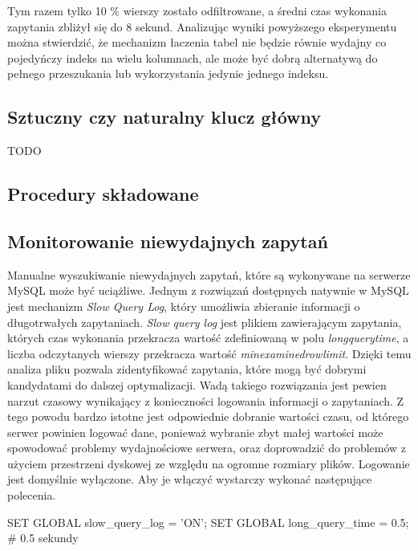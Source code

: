 Tym razem tylko 10 \% wierszy zostało odfiltrowane, a średni czas wykonania zapytania zbliżył się do 8 sekund. Analizując wyniki powyższego eksperymentu można stwierdzić, że mechanizm łaczenia tabel nie będzie równie wydajny co pojedyńczy indeks na wielu kolumnach, ale może być dobrą alternatywą do pełnego przeszukania lub wykorzystania jedynie jednego indeksu.
\subsection{Sztuczny czy naturalny klucz główny}
TODO

\subsection{Procedury składowane}

\subsection{Monitorowanie niewydajnych zapytań}
Manualne wyszukiwanie niewydajnych zapytań, które są wykonywane na serwerze MySQL może być uciążliwe. Jednym z rozwiązań dostępnych natywnie w MySQL jest mechanizm \textit{Slow Query Log}, który umożliwia zbieranie informacji o długotrwałych zapytaniach. \textit{Slow query log} jest plikiem zawierającym zapytania, których czas wykonania przekracza wartość zdefiniowaną w polu \textit{long\textunderscore query\textunderscore time}, a liczba odczytanych wierszy przekracza wartość \textit{min\textunderscore examined\textunderscore row\textunderscore limit}. Dzięki temu analiza pliku pozwala zidentyfikować zapytania, które mogą być dobrymi kandydatami do dalszej optymalizacji. Wadą takiego rozwiązania jest pewien narzut czasowy wynikający z konieczności logowania informacji o zapytaniach. Z tego powodu bardzo istotne jest odpowiednie dobranie wartości czasu, od którego serwer powinien logować dane, ponieważ wybranie zbyt małej wartości może spowodować problemy wydajnościowe serwera, oraz doprowadzić do problemów z użyciem przestrzeni dyskowej ze względu na ogromne rozmiary plików. Logowanie jest domyślnie wyłączone. Aby je włączyć wystarczy wykonać następujące polecenia.
\begin{spverbatim}
	SET GLOBAL slow_query_log = 'ON';
	SET GLOBAL long_query_time = 0.5; # 0.5 sekundy
\end{spverbatim}
